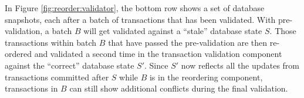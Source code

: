 In Figure \ref{fig:reorder:validator}, the bottom row shows a set of database snapshots, each after a batch of transactions that has been validated. With pre-validation, a batch $B$ will get validated against a ``stale'' database state $S$. Those transactions within batch $B$ that have passed the pre-validation are then re-ordered and validated a second time in the transaction validation component against the ``correct'' database state $S'$. Since $S'$ now reflects all the updates from transactions committed after $S$ while $B$ is in the reordering component, transactions in $B$ can still show additional conflicts during the final validation.



